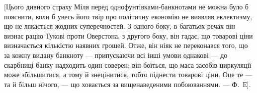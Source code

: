 [Цього дивного страху Міля перед однофунтівками-банкнотами не можна
було б пояснити, коли б увесь його твір про політичну економію не виявляв
еклектизму, що не лякається жодних суперечностей. З одного боку, в багатьох
речах він визнає рацію Тукові проти Оверстона, з другого боку, він гадає, що
товарові ціни визначається кількістю наявних грошей. Отже, він ніяк не переконався
того, що за кожну видану банкноту — припускаючи всі інші умови
однакові — до скарбниці банку надходить один соверен; він боїться, що маса
засобів циркуляції може збільшитися, а тому й знецінитися, тобто піднести
товарові ціни. Оце те — та й більш нічого, — що ховається за вищенаведеними
побоюваннями. — Ф.~Е].
